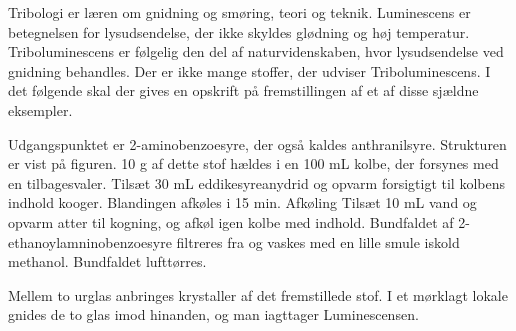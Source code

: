 



Tribologi er læren om gnidning og smøring, teori og teknik. Luminescens er betegnelsen for lysudsendelse, der ikke skyldes glødning og høj temperatur. Triboluminescens er følgelig den del af naturvidenskaben, hvor lysudsendelse ved gnidning behandles.
Der er ikke mange stoffer, der udviser Triboluminescens. I det følgende skal der gives en opskrift på fremstillingen af et af disse sjældne eksempler.

Udgangspunktet er 2-aminobenzoesyre, der også kaldes anthranilsyre. Strukturen er vist på figuren. 10 g af dette stof hældes i en 100 mL kolbe, der forsynes med en tilbagesvaler.
Tilsæt 30 mL eddikesyreanydrid og opvarm forsigtigt til kolbens indhold kooger.
Blandingen afkøles i 15 min.
Afkøling
Tilsæt 10 mL vand og opvarm atter til kogning, og afkøl igen kolbe med indhold.
Bundfaldet af 2-ethanoylamninobenzoesyre filtreres fra og vaskes med en lille smule iskold methanol.
Bundfaldet lufttørres.


Mellem to urglas anbringes krystaller af det fremstillede stof. I et mørklagt lokale gnides de to glas imod hinanden, og man iagttager Luminescensen.


